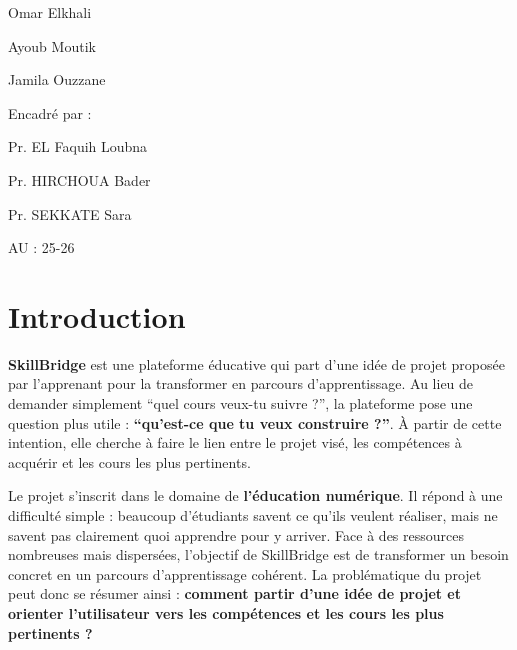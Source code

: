 \documentclass[12pt,a4paper]{article}
\begin{document}
\begin{titlepage}
\begin{minipage}[t]{0.42\textwidth}
        {\small Omar Elkhali}

        \vspace{0.25cm}

        {\small Ayoub Moutik}

        \vspace{0.25cm}

        {\small Jamila Ouzzane}
    \end{minipage}
    \hfill
    \begin{minipage}[t]{0.32\textwidth}
        {\small Encadré par :}

        \vspace{0.35cm}

        {\small Pr. EL Faquih Loubna}

        \vspace{0.25cm}

        {\small Pr. HIRCHOUA Bader}

        \vspace{0.25cm}

        {\small Pr. SEKKATE Sara}
    \end{minipage}

    \vfill

    \begin{center}
        {\small AU : 25-26}
    \end{center}

\end{titlepage}

\renewcommand{\contentsname}{Sommaire}
\tableofcontents
\newpage

\section{Introduction}
\textbf{SkillBridge} est une plateforme éducative qui part d'une idée de projet proposée par l'apprenant pour la transformer en parcours d'apprentissage. Au lieu de demander simplement ``quel cours veux-tu suivre ?'', la plateforme pose une question plus utile : \textbf{``qu'est-ce que tu veux construire ?''}. À partir de cette intention, elle cherche à faire le lien entre le projet visé, les compétences à acquérir et les cours les plus pertinents.

Le projet s'inscrit dans le domaine de \textbf{l'éducation numérique}. Il répond à une difficulté simple : beaucoup d'étudiants savent ce qu'ils veulent réaliser, mais ne savent pas clairement quoi apprendre pour y arriver. Face à des ressources nombreuses mais dispersées, l'objectif de SkillBridge est de transformer un besoin concret en un parcours d'apprentissage cohérent. La problématique du projet peut donc se résumer ainsi : \textbf{comment partir d'une idée de projet et orienter l'utilisateur vers les compétences et les cours les plus pertinents ?}
\end{document}
